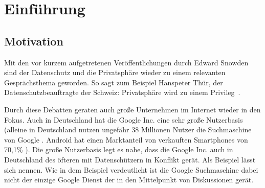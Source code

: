 %
% 

\chapter{Einführung}


\section{Motivation}
Mit den vor kurzem aufgetretenen Veröffentlichungen durch Edward Snowden sind der Datenschutz und die Privatsphäre wieder zu einem relevanten Gesprächsthema geworden. So sagt zum Beispiel Hanspeter Thür, der Datenschutzbeauftragte der Schweiz: \glqq Privatsphäre wird zu einem Privileg\grqq\ \cite{nzzdatenschutzprivileg}.

Durch diese Debatten geraten auch große Unternehmen im Internet wieder in den Fokus. Auch in Deutschland hat die Google Inc. eine sehr große Nutzerbasis (alleine in Deutschland nutzen ungefähr 38 Millionen Nutzer die Suchmaschine von Google \cite{statistagoogle}. Android hat einen Marktanteil von verkauften Smartphones von 70,1\% \cite{statistaandroid}). Die große Nutzerbasis legt es nahe, dass die Google Inc. auch in Deutschland des öfteren mit Datenschützern in Konflikt gerät. Als Beispiel lässt sich \cite{geodata} nennen. Wie in dem Beispiel verdeutlicht ist die Google Suchmaschine dabei nicht der einzige Google Dienst der in den Mittelpunkt von Diskussionen gerät.

